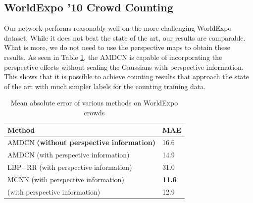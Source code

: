 \documentclass[10pt,twocolumn,letterpaper]{article}
\begin{document}
\subsection{WorldExpo '10 Crowd Counting}\label{worldexpo}


Our network performs reasonably well on the more challenging WorldExpo dataset. While it does not beat the state of the art, our results are comparable. What is more, we do not need to use the perspective maps to obtain these results. As seen in Table \ref{tab:worldexpo}, the AMDCN is capable of incorporating the perspective effects without scaling the Gaussians with perspective information. This shows that it is possible to achieve counting results that approach the state of the art with much simpler labels for the counting training data.

\begin{table}
    \begin{center}
    \begin{tabular}{|p{5.5cm}|p{0.7cm}|}
        \hline
         \textbf{Method} & \textbf{MAE}\\\hline
         AMDCN \textbf{(without perspective information)} & 16.6\\\hline
         AMDCN (with perspective information) & 14.9\\\hline
         LBP+RR \cite{zhang2016single} (with perspective information) & 31.0\\\hline
         MCNN \cite{zhang2016single} (with perspective information) & \textbf{11.6}\\\hline
         \cite{zhang2015cross} (with perspective information) & 12.9\\\hline
    \end{tabular}
    \end{center}
    \caption{Mean absolute error of various methods on WorldExpo crowds}
    \label{tab:worldexpo}
\end{table}
\end{document}
